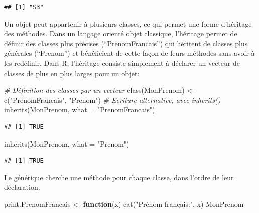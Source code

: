 \documentclass[
  11pt,
  french,
  a4paper,
  extrafontsizes,onecolumn,openright
  ]{memoir}
\newenvironment{Shaded}{\begin{snugshade}}{\end{snugshade}}
\newcommand{\AttributeTok}[1]{\textcolor[rgb]{0.77,0.63,0.00}{#1}}
\newcommand{\CommentTok}[1]{\textcolor[rgb]{0.56,0.35,0.01}{\textit{#1}}}
\newcommand{\ControlFlowTok}[1]{\textcolor[rgb]{0.13,0.29,0.53}{\textbf{#1}}}
\newcommand{\FunctionTok}[1]{\textcolor[rgb]{0.00,0.00,0.00}{#1}}
\newcommand{\NormalTok}[1]{#1}
\newcommand{\OtherTok}[1]{\textcolor[rgb]{0.56,0.35,0.01}{#1}}
\newcommand{\StringTok}[1]{\textcolor[rgb]{0.31,0.60,0.02}{#1}}
\begin{document}
\begin{verbatim}
## [1] "S3"
\end{verbatim}

\normalsize

Un objet peut appartenir à plusieurs classes, ce qui permet une forme d'héritage des méthodes.
Dans un langage orienté objet classique, l'héritage permet de définir des classes plus précises (``PrenomFrancais'') qui héritent de classes plus générales (``Prenom'') et bénéficient de cette façon de leurs méthodes sans avoir à les redéfinir.
Dans R, l'héritage consiste simplement à déclarer un vecteur de classes de plus en plus larges pour un objet:

\scriptsize

\begin{Shaded}
\begin{Highlighting}[]
\CommentTok{\# Définition des classes par un vecteur}
\FunctionTok{class}\NormalTok{(MonPrenom) }\OtherTok{\textless{}{-}} \FunctionTok{c}\NormalTok{(}\StringTok{"PrenomFrancais"}\NormalTok{, }\StringTok{"Prenom"}\NormalTok{)}
\CommentTok{\# Ecriture alternative, avec inherits()}
\FunctionTok{inherits}\NormalTok{(MonPrenom, }\AttributeTok{what =} \StringTok{"PrenomFrancais"}\NormalTok{)}
\end{Highlighting}
\end{Shaded}

\begin{verbatim}
## [1] TRUE
\end{verbatim}

\begin{Shaded}
\begin{Highlighting}[]
\FunctionTok{inherits}\NormalTok{(MonPrenom, }\AttributeTok{what =} \StringTok{"Prenom"}\NormalTok{)}
\end{Highlighting}
\end{Shaded}

\begin{verbatim}
## [1] TRUE
\end{verbatim}

\normalsize

Le générique cherche une méthode pour chaque classe, dans l'ordre de leur déclaration.

\scriptsize

\begin{Shaded}
\begin{Highlighting}[]
\NormalTok{print.PrenomFrancais }\OtherTok{\textless{}{-}} \ControlFlowTok{function}\NormalTok{(x) }\FunctionTok{cat}\NormalTok{(}\StringTok{"Prénom français:"}\NormalTok{, }
\NormalTok{    x)}
\NormalTok{MonPrenom}
\end{Highlighting}
\end{Shaded}
\end{document}
